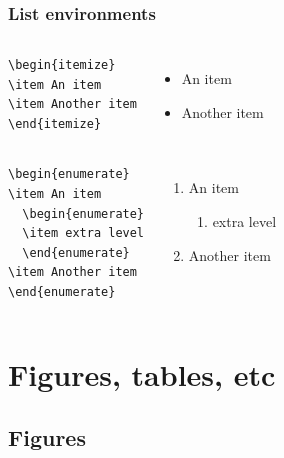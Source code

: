 \documentclass{beamer}
\begin{document}
\begin{frame}[fragile]
  \frametitle{List environments}
  
  \begin{columns}[c]
\begin{verbatim}  
\begin{itemize}
\item An item
\item Another item
\end{itemize}
\end{verbatim}

\begin{itemize}
\item An item
\item Another item
\end{itemize}
  \end{columns}

\pause

  \begin{columns}[c]
\begin{verbatim}  
\begin{enumerate}
\item An item
  \begin{enumerate}
  \item extra level
  \end{enumerate}
\item Another item
\end{enumerate}
\end{verbatim}

\begin{enumerate}
\item An item
  \begin{enumerate}
  \item extra level
  \end{enumerate}
\item Another item
\end{enumerate}
  \end{columns}

\end{frame}

\section{Figures, tables, etc}

\subsection{Figures}
\end{document}

